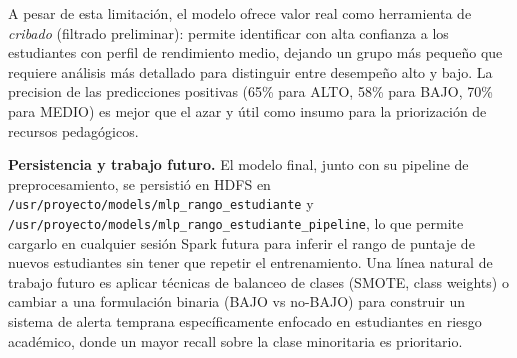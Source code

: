 A pesar de esta limitación, el modelo ofrece valor real como herramienta de \textit{cribado} (filtrado preliminar): permite identificar con alta confianza a los estudiantes con perfil de rendimiento medio, dejando un grupo más pequeño que requiere análisis más detallado para distinguir entre desempeño alto y bajo. La precision de las predicciones positivas (65\% para ALTO, 58\% para BAJO, 70\% para MEDIO) es mejor que el azar y útil como insumo para la priorización de recursos pedagógicos.

\textbf{Persistencia y trabajo futuro.} El modelo final, junto con su pipeline de preprocesamiento, se persistió en HDFS en \texttt{/usr/proyecto/models/mlp\_rango\_estudiante} y \texttt{/usr/proyecto/models/mlp\_rango\_estudiante\_pipeline}, lo que permite cargarlo en cualquier sesión Spark futura para inferir el rango de puntaje de nuevos estudiantes sin tener que repetir el entrenamiento. Una línea natural de trabajo futuro es aplicar técnicas de balanceo de clases (SMOTE, class weights) o cambiar a una formulación binaria (BAJO vs no-BAJO) para construir un sistema de alerta temprana específicamente enfocado en estudiantes en riesgo académico, donde un mayor recall sobre la clase minoritaria es prioritario.
